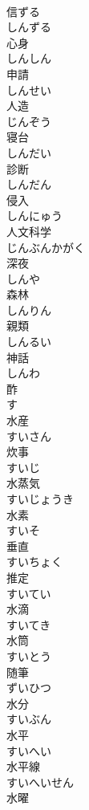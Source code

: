 \documentclass[8pt]{extreport}
\begin{document}
\begin{CJK}{UTF8}{min}
\\	信ずる 
\\	しんずる	
\\	心身 
\\	しんしん	
\\	申請 
\\	しんせい	
\\	人造 
\\	じんぞう	
\\	寝台 
\\	しんだい	
\\	診断 
\\	しんだん	
\\	侵入 
\\	しんにゅう	
\\	人文科学 
\\	じんぶんかがく	
\\	深夜 
\\	しんや	
\\	森林 
\\	しんりん	
\\	親類 
\\	しんるい	
\\	神話 
\\	しんわ	
\\	酢 
\\	す	
\\	水産 
\\	すいさん	
\\	炊事 
\\	すいじ	
\\	水蒸気 
\\	すいじょうき	
\\	水素 
\\	すいそ	
\\	垂直 
\\	すいちょく	
\\	推定 
\\	すいてい	
\\	水滴 
\\	すいてき	
\\	水筒 
\\	すいとう	
\\	随筆 
\\	ずいひつ	
\\	水分 
\\	すいぶん	
\\	水平 
\\	すいへい	
\\	水平線 
\\	すいへいせん	
\\	水曜 

\end{CJK}
\end{document}
